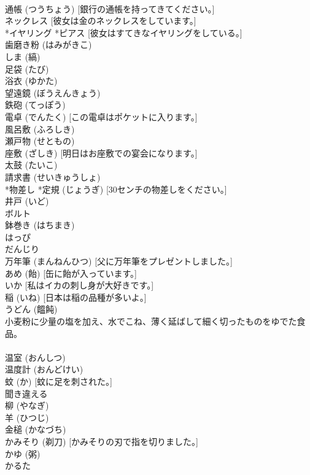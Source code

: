 \documentclass[8pt]{extreport}
\begin{document}
\begin{CJK}{UTF8}{min}
\\	通帳 (つうちょう) [銀行の通帳を持ってきてください。]
\\	ネックレス [彼女は金のネックレスをしています。]
\\	*イヤリング *ピアス [彼女はすてきなイヤリングをしている。]
\\	歯磨き粉 (はみがきこ)
\\	しま (縞)
\\	足袋 (たび)
\\	浴衣 (ゆかた)
\\	望遠鏡 (ぼうえんきょう)
\\	鉄砲 (てっぽう)
\\	電卓 (でんたく) [この電卓はポケットに入ります。]
\\	風呂敷 (ふろしき)
\\	瀬戸物 (せともの)
\\	座敷 (ざしき) [明日はお座敷での宴会になります。]
\\	太鼓 (たいこ)
\\	請求書 (せいきゅうしょ)
\\	*物差し *定規 (じょうぎ) [30センチの物差しをください。]
\\	井戸 (いど)
\\	ボルト
\\	鉢巻き (はちまき)
\\	はっぴ
\\	だんじり
\\	万年筆 (まんねんひつ) [父に万年筆をプレゼントしました。]
\\	あめ (飴) [缶に飴が入っています。]
\\	いか [私はイカの刺し身が大好きです。]
\\	稲 (いね) [日本は稲の品種が多いよ。]
\\	うどん (饂飩) 
\\	小麦粉に少量の塩を加え、水でこね、薄く延ばして細く切ったものをゆでた食品。
\\	[私はお昼にうどんを食べました。]
\\	温室 (おんしつ)
\\	温度計 (おんどけい)
\\	蚊 (か) [蚊に足を刺された。]
\\	聞き違える
\\	柳 (やなぎ)
\\	羊 (ひつじ)
\\	金槌 (かなづち)
\\	かみそり (剃刀) [かみそりの刃で指を切りました。]
\\	かゆ (粥)
\\	かるた

\end{CJK}
\end{document}
